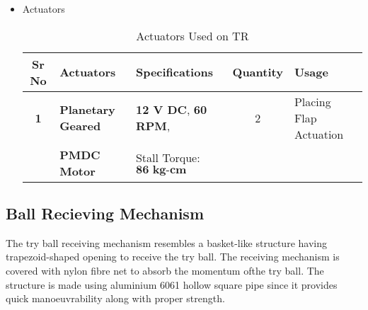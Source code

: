 \begin{itemize}
            \item Actuators
            \begin{table}[h]
                \caption {Actuators Used on TR} \label{Actuators_TR}  \small
                \begin{tabular}{|c|l|l|c|l|}
                    \hline  \hline
                    \textbf{Sr No}  & \textbf{Actuators}        & \textbf{Specifications}               & \textbf{Quantity}  & \textbf{Usage}                                               \\ \hline   \hline
                    \textbf{1}      & \textbf{Planetary Geared} & \textbf{12 V DC},  \textbf{60 RPM},   & 2                  & Placing Flap Actuation                                       \\
                                    & \textbf{PMDC Motor}       & Stall Torque: $\textbf{86 kg-cm}$     &                    &                                                              \\ \hline   \hline  
                \end{tabular}
            \end{table}
        \end{itemize}


    \subsection{Ball Recieving Mechanism}
        The try ball receiving mechanism resembles a basket-like structure having trapezoid-shaped opening to receive the try ball. The 
        receiving mechanism is covered with nylon fibre net to absorb the momentum ofthe try ball. The structure is made using aluminium 6061 
        hollow square pipe since it provides quick manoeuvrability along with proper strength.
    
